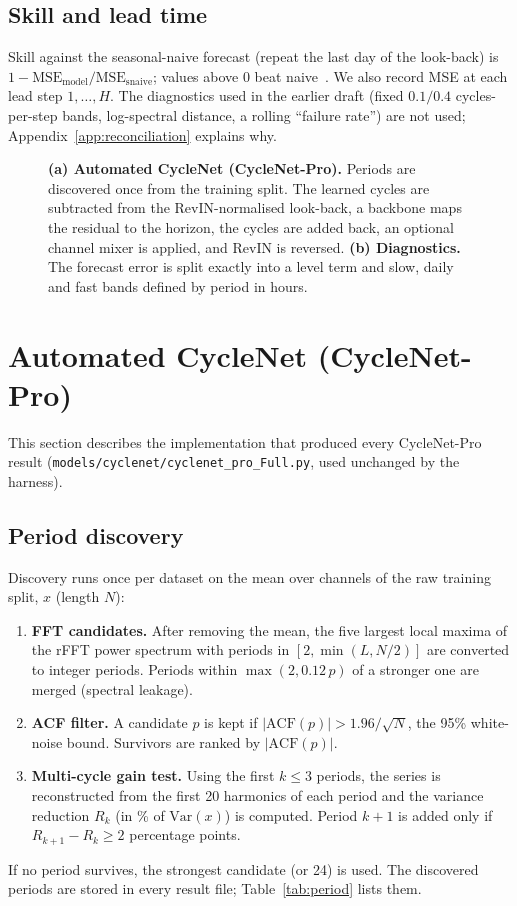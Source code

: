 \documentclass[11pt,a4paper]{article}
\begin{document}
\subsection{Skill and lead time}
Skill against the seasonal-naive forecast (repeat the last day of the look-back) is $1-\text{MSE}_{\text{model}}/\text{MSE}_{\text{snaive}}$; values above 0 beat naive~\cite{hyndman2021fpp3}. We also record MSE at each lead step $1,\dots,H$. The diagnostics used in the earlier draft (fixed $0.1/0.4$ cycles-per-step bands, log-spectral distance, a rolling ``failure rate'') are not used; Appendix~\ref{app:reconciliation} explains why.

\begin{figure}[t]
\centering

\caption{\textbf{(a) Automated CycleNet (CycleNet-Pro).} Periods are discovered once from the training split. The learned cycles are subtracted from the RevIN-normalised look-back, a backbone maps the residual to the horizon, the cycles are added back, an optional channel mixer is applied, and RevIN is reversed. \textbf{(b) Diagnostics.} The forecast error is split exactly into a level term and slow, daily and fast bands defined by period in hours.}
\label{fig:architectures}
\end{figure}

\section{Automated CycleNet (CycleNet-Pro)}
\label{sec:cyclenet}
This section describes the implementation that produced every CycleNet-Pro result (\nolinkurl{models/cyclenet/cyclenet_pro_Full.py}, used unchanged by the harness).

\subsection{Period discovery}
Discovery runs once per dataset on the mean over channels of the raw training split, $x$ (length $N$):
\begin{enumerate}
    \item \textbf{FFT candidates.} After removing the mean, the five largest local maxima of the rFFT power spectrum with periods in $[2,\min(L,N/2)]$ are converted to integer periods. Periods within $\max(2, 0.12\,p)$ of a stronger one are merged (spectral leakage).
    \item \textbf{ACF filter.} A candidate $p$ is kept if $|\text{ACF}(p)|>1.96/\sqrt{N}$, the 95\% white-noise bound. Survivors are ranked by $|\text{ACF}(p)|$.
    \item \textbf{Multi-cycle gain test.} Using the first $k\le 3$ periods, the series is reconstructed from the first 20 harmonics of each period and the variance reduction $R_k$ (in \% of $\mathrm{Var}(x)$) is computed. Period $k+1$ is added only if $R_{k+1}-R_k\ge 2$ percentage points.
\end{enumerate}
If no period survives, the strongest candidate (or 24) is used. The discovered periods are stored in every result file; Table~\ref{tab:period} lists them.
\end{document}
